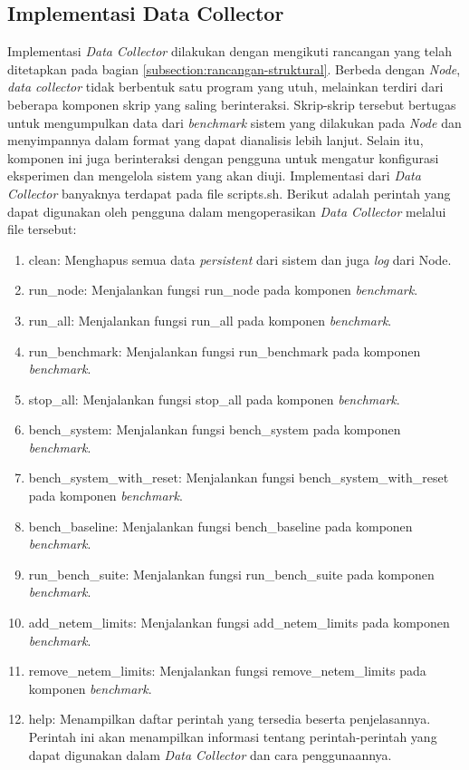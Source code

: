 \subsection{Implementasi Data Collector}
\label{subsection:implementasi-data-collector}

Implementasi \textit{Data Collector} dilakukan dengan mengikuti rancangan yang telah ditetapkan pada bagian \ref{subsection:rancangan-struktural}. Berbeda dengan \textit{Node}, \textit{data collector} tidak berbentuk satu program yang utuh, melainkan terdiri dari beberapa komponen skrip yang saling berinteraksi. Skrip-skrip tersebut bertugas untuk mengumpulkan data dari \textit{benchmark} sistem yang dilakukan pada \textit{Node} dan menyimpannya dalam format yang dapat dianalisis lebih lanjut. Selain itu, komponen ini juga berinteraksi dengan pengguna untuk mengatur konfigurasi eksperimen dan mengelola sistem yang akan diuji. Implementasi dari \textit{Data Collector} banyaknya terdapat pada file scripts.sh. Berikut adalah perintah yang dapat digunakan oleh pengguna dalam mengoperasikan \textit{Data Collector} melalui file tersebut:

\begin{enumerate}
  \item clean: Menghapus semua data \textit{persistent} dari sistem dan juga \textit{log} dari Node.
  \item run\_node: Menjalankan fungsi run\_node pada komponen \textit{benchmark}.
  \item run\_all: Menjalankan fungsi run\_all pada komponen \textit{benchmark}.
  \item run\_benchmark: Menjalankan fungsi run\_benchmark pada komponen \textit{benchmark}.
  \item stop\_all: Menjalankan fungsi stop\_all pada komponen \textit{benchmark}.
  \item bench\_system: Menjalankan fungsi bench\_system pada komponen \textit{benchmark}.
  \item bench\_system\_with\_reset: Menjalankan fungsi bench\_system\_with\_reset pada komponen \textit{benchmark}.
  \item bench\_baseline: Menjalankan fungsi bench\_baseline pada komponen \textit{benchmark}.
  \item run\_bench\_suite: Menjalankan fungsi run\_bench\_suite pada komponen \textit{benchmark}.
  \item add\_netem\_limits: Menjalankan fungsi add\_netem\_limits pada komponen \textit{benchmark}.
  \item remove\_netem\_limits: Menjalankan fungsi remove\_netem\_limits pada komponen \textit{benchmark}.
  \item help: Menampilkan daftar perintah yang tersedia beserta penjelasannya. Perintah ini akan menampilkan informasi tentang perintah-perintah yang dapat digunakan dalam \textit{Data Collector} dan cara penggunaannya.
\end{enumerate}

